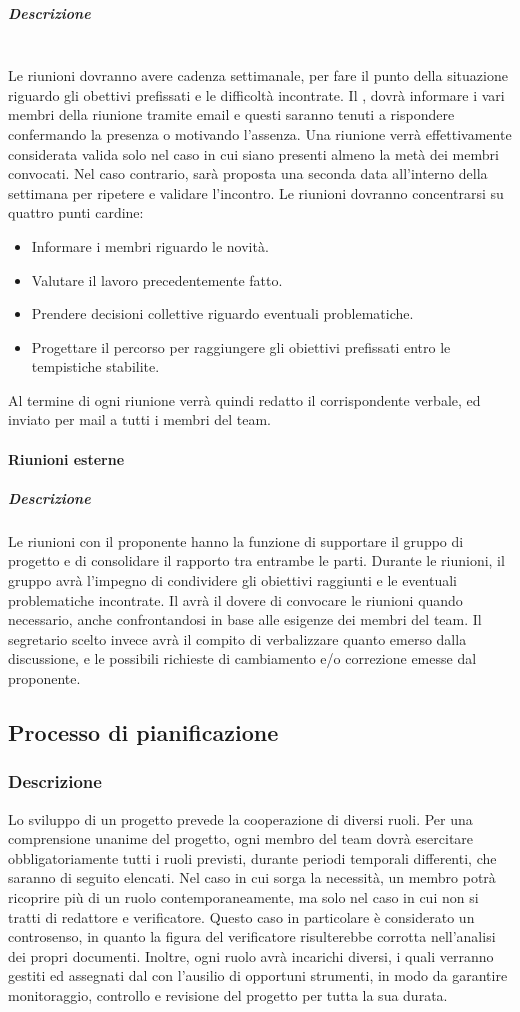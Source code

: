 \subparagraph{Descrizione}
~\\Le riunioni dovranno avere cadenza settimanale, per fare il punto della situazione riguardo gli obettivi prefissati e
le difficoltà incontrate. Il \RdP{}, dovrà informare i vari membri della riunione tramite email e questi saranno tenuti a rispondere confermando la presenza o motivando l'assenza. Una riunione verrà effettivamente considerata
valida solo nel caso in cui siano presenti almeno la metà dei membri convocati. Nel caso contrario, sarà proposta una seconda data all'interno della settimana per ripetere e validare l'incontro.
Le riunioni dovranno concentrarsi su quattro punti cardine:
\begin{itemize}
	\item Informare i membri riguardo le novità.
	\item Valutare il lavoro precedentemente fatto.
	\item Prendere decisioni collettive riguardo eventuali problematiche.
	\item Progettare il percorso per raggiungere gli obiettivi prefissati entro le tempistiche stabilite.
\end{itemize}
Al termine di ogni riunione verrà quindi redatto il corrispondente verbale, ed inviato per mail a tutti i membri del team.

\paragraph{Riunioni esterne}
\subparagraph{Descrizione}
Le riunioni con il proponente hanno la funzione di supportare il gruppo di progetto e di consolidare il rapporto tra entrambe le parti. Durante le riunioni, il gruppo avrà l'impegno di condividere gli obiettivi raggiunti e le eventuali problematiche incontrate. 
Il \RdP{} avrà il dovere di convocare le riunioni quando necessario, anche confrontandosi in base alle esigenze dei membri del team. Il segretario scelto invece avrà il compito di verbalizzare quanto emerso dalla discussione, e le possibili richieste di cambiamento e/o correzione emesse dal proponente.

\subsection{Processo di pianificazione}
\subsubsection{Descrizione}
Lo sviluppo di un progetto prevede la cooperazione di diversi ruoli. Per una comprensione unanime del progetto, ogni membro del team dovrà esercitare obbligatoriamente tutti i ruoli previsti, durante periodi temporali differenti, che saranno di seguito elencati. Nel caso in cui sorga la necessità, un membro potrà ricoprire più di un ruolo contemporaneamente, ma solo nel caso in cui non si tratti di redattore e verificatore. Questo caso in particolare è considerato un controsenso, in quanto la figura del verificatore risulterebbe corrotta nell'analisi dei propri documenti. Inoltre, ogni ruolo avrà incarichi diversi, i quali verranno gestiti ed assegnati dal \RdP{} con l'ausilio di opportuni strumenti, in modo da garantire monitoraggio, controllo e revisione del progetto per tutta la sua durata.
